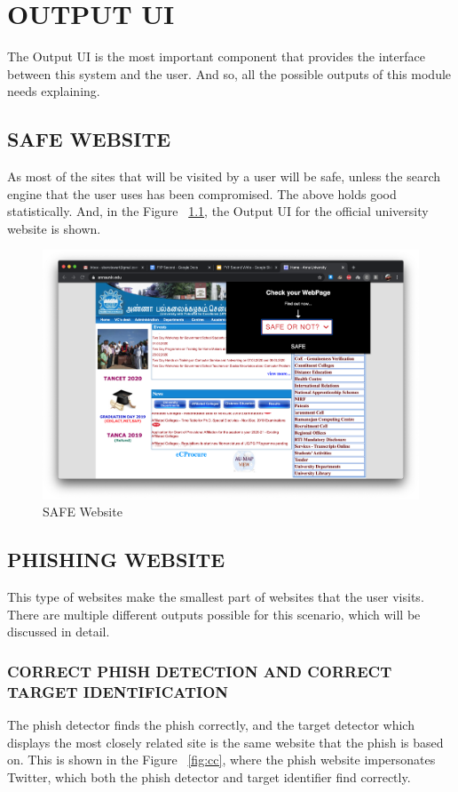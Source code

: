 
\chapter{OUTPUT UI}
The Output UI is the most important component that provides the interface between this system and the user. And so, all the possible outputs of this module needs explaining. 

\section{SAFE WEBSITE}
As most of the sites that will be visited by a user will be safe, unless the search engine that the user uses has been compromised. The above holds good statistically. And, in the Figure  ~\ref{fig:ahtmlc}, the Output UI for the official university website is shown.

\begin{figure}[htp]
\centering
\includegraphics[scale=0.2]{Figures/image2.png}
\caption{SAFE Website}
\label{fig:ahtmlc}
\end{figure}

\section{PHISHING WEBSITE}
This type of websites make the smallest part of websites that the user visits. There are multiple different outputs possible for this scenario, which will be discussed in detail.

\subsection{CORRECT PHISH DETECTION AND CORRECT TARGET IDENTIFICATION}
The phish detector finds the phish correctly, and the target detector which displays the most closely related site is the same website that the phish is based on. This is shown in the Figure ~\ref{fig:cc}, where the phish website impersonates Twitter, which both the phish detector and target identifier find correctly.

